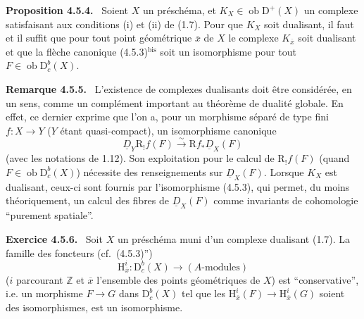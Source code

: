 \documentclass[11pt]{article}
\newenvironment{statement}[1]{\par\medskip\noindent\textbf{#1.}\ }{\par\medskip}
\renewcommand{\H}{\mathrm{H}}
\newcommand{\R}{\mathrm{R}}
\newcommand{\D}{\mathrm{D}}
\newcommand{\Z}{\mathbb{Z}}
\newcommand{\ob}{\operatorname{ob}}
\newcommand{\ol}[1]{\overline{#1}}
\providecommand{\ob}{\operatorname{ob}}
\providecommand{\R}{\mathrm R}
\providecommand{\Z}{\mathbb Z}
\begin{document}
\begin{statement}{Proposition 4.5.4}
Soient $X$ un préschéma, et $K_X\in\ob\D^+(X)$ un complexe satisfaisant aux conditions (i) et (ii) de (1.7). Pour que $K_X$ soit dualisant, il faut et il suffit que pour tout point géométrique $\ol{x}$ de $X$ le complexe $K_{\ol{x}}$ soit dualisant et que la flèche canonique (4.5.3)$^{\mathrm{bis}}$ soit un isomorphisme pour tout $F\in\ob\D_c^b(X)$.
\end{statement}

\begin{statement}{Remarque 4.5.5}
L'existence de complexes dualisants doit être considérée, en un sens, comme un complément important au théorème de dualité globale. En effet, ce dernier exprime que l'on a, pour un morphisme séparé de type fini $f:X\to Y$ ($Y$ étant quasi-compact), un isomorphisme canonique
\[
\underline{D}_Y\R_!f(F)\xrightarrow{\sim}\R f_*\underline{D}_X(F)
\]
(avec les notations de 1.12). Son exploitation pour le calcul de $\R_!f(F)$ (quand $F\in\ob\D_c^b(X)$) nécessite des renseignements sur $\underline{D}_X(F)$. Lorsque $K_X$ est dualisant, ceux-ci sont fournis par l'isomorphisme (4.5.3), qui permet, du moins théoriquement, un calcul des fibres de $\underline{D}_X(F)$ comme invariants de cohomologie ``purement spatiale''.
\end{statement}

\begin{statement}{Exercice 4.5.6}
Soit $X$ un préschéma muni d'un complexe dualisant (1.7). La famille des foncteurs (cf.~(4.5.3)'')
\[
\H_{\ol{x}}^i:\D_c^b(X)\longrightarrow (A\text{-modules})
\]
($i$ parcourant $\Z$ et $\ol{x}$ l'ensemble des points géométriques de $X$) est ``conservative'', i.e. un morphisme $F\to G$ dans $\D_c^b(X)$ tel que les $\H_{\ol{x}}^i(F)\to\H_{\ol{x}}^i(G)$ soient des isomorphismes, est un isomorphisme.
\end{statement}
\end{document}
